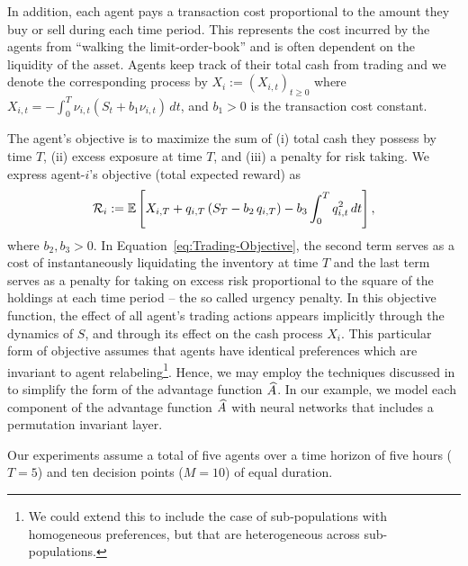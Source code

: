 \documentclass[onefignum,onetabnum]{siamonline171218}
\begin{document}

In addition, each agent pays a transaction cost proportional to the amount they buy or sell during each time period. This represents the cost incurred by the agents from ``walking the limit-order-book'' and is often dependent on the liquidity of the asset. Agents keep track of their total cash from trading and we denote the corresponding process by $X_i:=(X_{i,t})_{t\ge0}$ where $X_{i,t} = - \int_0^T \nu_{i,t} \left( S_{t} + b_1 \nu_{i,t} \right) \, dt$, and $b_1 > 0$ is the transaction cost constant.

The agent's objective is to maximize the sum of (i) total cash they possess by time $T$, (ii) excess exposure at time $T$, and (iii) a penalty for risk taking. We express agent-$i$'s objective (total expected reward) as
\begin{equation} \label{eq:Trading-Objective}
	\Ri:=
	\E\left[ X_{i,T} + q_{i,T} \left( S_{T} - b_2 \, q_{i,T} \right)
	- b_3 \int_0^T q_{i,t}^2 \, dt \right],
\end{equation}
where $b_2,b_3>0$. In Equation~\eqref{eq:Trading-Objective}, the second term serves as a cost of instantaneously liquidating the inventory at time $T$ and the last term serves as a penalty for taking on excess risk proportional to the square of the holdings at each time period -- the so called urgency penalty. In this objective function, the effect of all agent's trading actions appears implicitly through the dynamics of $S$, and through its effect on the cash process $X_{i}$. This particular form of objective assumes that agents have identical preferences which are invariant to agent relabeling\footnote{We could extend this to include the case of sub-populations with homogeneous preferences, but that are heterogeneous across sub-populations.}. Hence, we may employ the techniques discussed in  to simplify the form of the advantage function $\widehat{A}$. In our example, we model each component of the advantage function $\widehat{A}$ with neural networks that includes a permutation invariant layer. 

Our experiments assume a total of five agents over a time horizon of five hours ($T=5$) and ten decision points ($M=10$) of equal duration.
\end{document}
